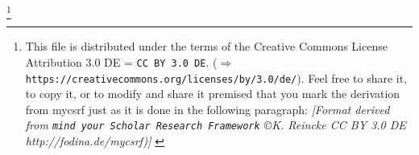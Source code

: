 %
%
%

\footnote{This file is distributed under the terms of the
Creative Commons License Attribution 3.0 DE = \texttt{CC BY 3.0 DE}.
($\Rightarrow$ \texttt{https://creativecommons.org/licenses/by/3.0/de/}).
Feel free to share it, to copy it, or to modify and share it
premised that you mark the derivation from mycsrf just as it
is done in the following paragraph:
\newline 
{ \tiny \itshape [Format derived from \texttt{mind your Scholar Research
Framework} \copyright K. Reincke CC BY 3.0 DE http://fodina.de/mycsrf)] }}

